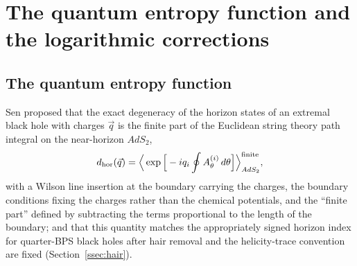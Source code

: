 \section{The quantum entropy function and the logarithmic corrections}\label{sec:quantum}

\subsection{The quantum entropy function}\label{ssec:qef}

Sen \cite{Sen08qef} proposed that the exact degeneracy of the horizon states of an extremal black hole with charges $\vec q$ is the finite part of the Euclidean string theory path integral on the near-horizon $AdS_2$,
\begin{equation}\label{eq:qef}
d_{\rm hor}(\vec q) = \Big\langle \exp\Big[-i q_i\oint A^{(i)}_\theta\, d\theta\Big]\Big\rangle^{\rm finite}_{AdS_2} ,
\end{equation}
with a Wilson line insertion at the boundary carrying the charges, the boundary conditions fixing the charges rather than the chemical potentials, and the ``finite part'' defined by subtracting the terms proportional to the length of the boundary; and that this quantity matches the appropriately signed horizon index for quarter-BPS black holes after hair removal and the helicity-trace convention are fixed (Section~\ref{ssec:hair}).

